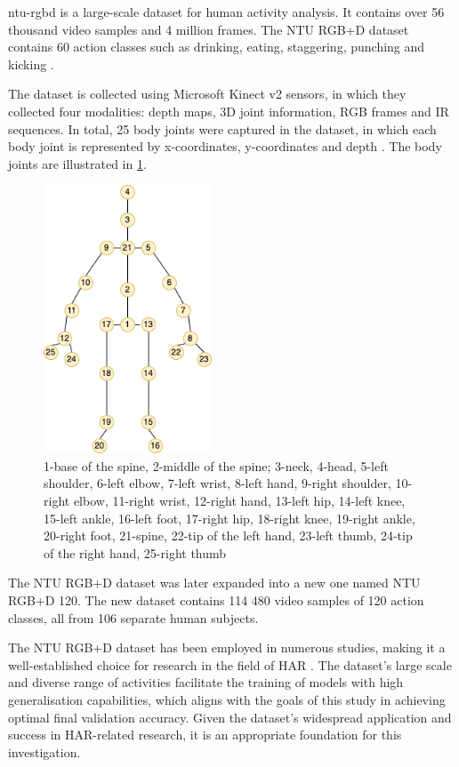 \Gls{ntu-rgbd} is a large-scale dataset for human activity analysis. It contains over 56 thousand video samples and 4 million frames. The NTU RGB+D dataset contains 60 action classes such as drinking, eating, staggering, punching and kicking \autocite{Shahroudy_2016_CVPR}. 

The dataset is collected using Microsoft Kinect v2 sensors, in which they collected four modalities: depth maps, 3D joint information, RGB frames and IR sequences. In total, 25 body joints were captured in the dataset, in which each body joint is represented by x-coordinates, y-coordinates and depth \autocite{Shahroudy_2016_CVPR}. The body joints are illustrated in \cref{fig:ntu_body_joints}. 

\begin{figure}[!ht]
    \centering
    \includegraphics[width=5cm]{figures/nturgb.drawio.png}
    \caption{1-base of the spine, 2-middle of the spine; 3-neck, 4-head, 5-left shoulder, 6-left elbow, 7-left wrist, 8-left hand, 9-right shoulder, 10-right elbow, 11-right wrist, 12-right hand, 13-left hip, 14-left knee, 15-left ankle, 16-left foot, 17-right hip, 18-right knee, 19-right ankle, 20-right foot, 21-spine, 22-tip of the left hand, 23-left thumb, 24-tip of the right hand, 25-right thumb}
    \label{fig:ntu_body_joints}
\end{figure}

The NTU RGB+D dataset was later expanded into a new one named NTU RGB+D 120. The new dataset contains 114 480 video samples of 120 action classes, all from 106 separate human subjects. 

The NTU RGB+D dataset has been employed in numerous studies, making it a well-established choice for research in the field of HAR \autocite{yan2018spatial, si2019attention, cheng2020skeleton}. The dataset's large scale and diverse range of activities facilitate the training of models with high generalisation capabilities, which aligns with the goals of this study in achieving optimal final validation accuracy. Given the dataset's widespread application and success in HAR-related research, it is an appropriate foundation for this investigation.